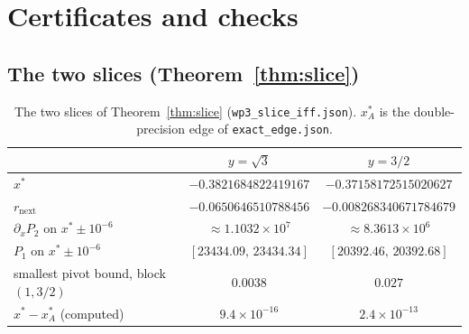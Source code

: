 \documentclass[11pt]{article}
\theoremstyle{definition}
\theoremstyle{remark}
\begin{document}
\section{Certificates and checks}\label{app:certs}

\subsection{The two slices (Theorem~\ref{thm:slice})}\label{app:slice}

\begin{table}[ht]\centering\footnotesize
\caption{The two slices of Theorem~\ref{thm:slice} (\texttt{wp3\_slice\_iff.json}). $x^*_A$ is the double-precision
edge of \texttt{exact\_edge.json}.}\label{tab:slice}
\begin{tabular}{lcc}\toprule
 & $y=\sqrt3$ & $y=3/2$\\ \midrule
$x^*$ & $-0.3821684822419167$ & $-0.37158172515020627$\\
$r_{\mathrm{next}}$ & $-0.0650646510788456$ & $-0.008268340671784679$\\
$\partial_xP_2$ on $x^*\pm10^{-6}$ & $\approx1.1032\times10^{7}$ & $\approx8.3613\times10^{6}$\\
$P_1$ on $x^*\pm10^{-6}$ & $[23434.09,\,23434.34]$ & $[20392.46,\,20392.68]$\\
smallest pivot bound, block $(1,3/2)$ & $0.0038$ & $0.027$\\
$x^*-x^*_A$ (computed) & $9.4\times10^{-16}$ & $2.4\times10^{-13}$\\
\bottomrule\end{tabular}
\end{table}
\end{document}
